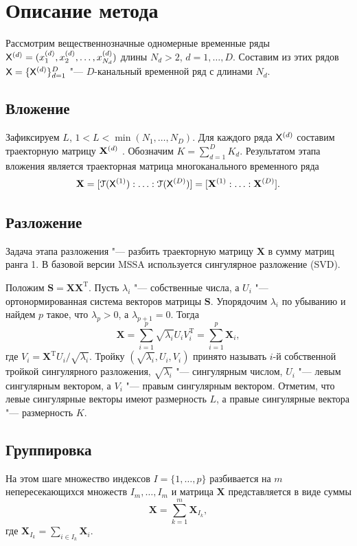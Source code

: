 \documentclass[specialist,
substylefile = spbu_report.rtx,
subf,href,colorlinks=true, 12pt]{disser}
\newcommand{\traj}{\mathbf{X}}
\newcommand{\transponse}{^\mathrm{T}}
\theoremstyle{definition}
\newtheorem{definition}{Определение}
\begin{document}
\section{Описание метода}
Рассмотрим вещественнозначные одномерные временные ряды $\mathsf{X}^{(d)}=(x_1^{(d)}, x_2^{(d)},\ldots, x_{N_d}^{(d)})$ длины $N_d>2$, $d=1,\ldots,D$. Составим из этих рядов $\mathsf{X}=\{\mathsf{X}^{(d)}\}_{d=1}^D$ "--- $D$-канальный временной ряд с длинами $N_d$.
\subsection{Вложение}\label{sect:embedding}
Зафиксируем $L$, $1<L<\min(N_1,\ldots,N_D)$. Для каждого ряда $\mathsf{X}^{(d)}$ составим траекторную матрицу $\mathbf{X}^{(d)}$ . Обозначим $K=\sum_{d=1}^D K_d$. Результатом этапа вложения является траекторная матрица многоканального временного ряда
\begin{equation}\label{eq:traj}
	\bfX=[\cT(\tX^{(1)}):\ldots:\cT(\tX^{(D)})]=[\traj^{(1)}:\ldots:\traj^{(D)}].
\end{equation}
\subsection{Разложение}
Задача этапа разложения "--- разбить траекторную матрицу $\traj$ в сумму матриц ранга 1. В базовой версии MSSA используется сингулярное разложение (SVD).

Положим $\mathbf{S}=\traj\traj\transponse$. Пусть $\lambda_i$ "--- собственные числа, а $U_i$ "--- ортонормированная система векторов матрицы $\mathbf{S}$. Упорядочим $\lambda_i$ по убыванию и найдем $p$ такое, что $\lambda_p>0$, а $\lambda_{p+1}=0$. Тогда
\[
	\traj=\sum_{i=1}^p\sqrt{\lambda_i}U_iV_i\transponse=\sum_{i=1}^p\traj_i,
\]
где $V_i=\traj\transponse U_i/\sqrt{\lambda_i}$. Тройку $(\sqrt{\lambda_i}, U_i, V_i)$ принято называть $i$-й собственной тройкой сингулярного разложения, $\sqrt{\lambda_i}$ "--- сингулярным числом, $U_i$ "--- левым сингулярным вектором, а $V_i$ "--- правым сингулярным вектором. Отметим, что левые сингулярные векторы имеют размерность $L$, а правые сингулярные вектора "--- размерность $K$.
\subsection{Группировка}\label{sect:grouping}
На этом шаге множество индексов $I=\{1,\ldots,p\}$ разбивается на $m$ непересекающихся множеств $I_m,\ldots,I_m$ и матрица $\traj$ представляется в виде суммы
\[
	\traj = \sum_{k=1}^m \traj_{I_k},
\]
где $\traj_{I_k}=\sum_{i\in I_k}\traj_i$.
\end{document}
